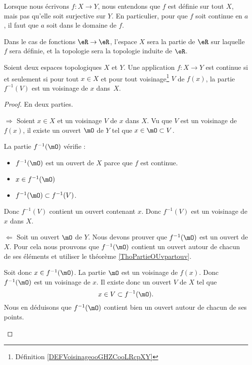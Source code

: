 \begin{normaltext}
    Lorsque nous écrivons \( f\colon X\to Y\), nous entendons que \( f\) est définie sur tout \( X\), mais pas qu'elle soit surjective sur \( Y\). En particulier, pour que \( f\) soit continue en \( a\), il faut que \( a\) soit dans le domaine de \( f\). 

    Dans le cas de fonctions \( \eR\to \eR\), l'espace \( X\) sera la partie de \( \eR\) sur laquelle \( f\) sera définie, et la topologie sera la topologie induite de \( \eR\).
\end{normaltext} 

\begin{proposition}       \label{PROPooOXBCooIzLaPe}
    Soient deux espaces topologiques \( X\) et \( Y\). Une application \( f\colon X\to Y\) est continue si et seulement si pour tout \( x\in X\) et pour tout voisinage\footnote{Définition \ref{DEFVoisinageooGHZCooLRcpXY}} \( V\) de \( f(x)\), la partie \( f^{-1}(V)\) est un voisinage de \( x\) dans~\( X\).
\end{proposition}

\begin{proof}
    En deux parties.
    \begin{subproof}
    \item[\( \Rightarrow\)]
        Soient \( x\in X\) et un voisinage \( V\) de \( x\) dans \( X\). Vu que \( V\) est un voisinage de \( f(x)\), il existe un ouvert \( \mO\) de \( Y\) tel que \( x\in \mO\subset V\).

        La partie \( f^{-1}(\mO)\) vérifie :
        \begin{itemize}
            \item \( f^{-1}(\mO)\) est un ouvert de \( X\) parce que \( f\) est continue.
            \item \( x\in f^{-1}(\mO)\)
            \item \( f^{-1}(\mO)\subset f^{-1}(V)\).
        \end{itemize}
        Donc \( f^{-1}(V)\) contient un ouvert contenant \( x\). Donc \( f^{-1}(V)\) est un voisinage de \( x\) dans \( X\).
    \item[\( \Leftarrow\)]
        Soit un ouvert \( \mO\) de \( Y\). Nous devons prouver que \( f^{-1}(\mO)\) est un ouvert de \( X\). Pour cela nous prouvons que \( f^{-1}(\mO)\) contient un ouvert autour de chacun de ses éléments et utiliser le théorème \ref{ThoPartieOUvpartouv}.

        Soit donc \( x\in f^{-1}(\mO)\). La partie \( \mO\) est un voisinage de \( f(x)\). Donc \( f^{-1}(\mO)\) est un voisinage de \( x\). Il existe donc un ouvert \( V\) de \( X\) tel que
        \begin{equation}
            x\in V\subset f^{-1}(\mO).
        \end{equation}
        Nous en déduisons que \( f^{-1}(\mO)\) contient bien un ouvert autour de chacun de ses points.
    \end{subproof}
\end{proof}

